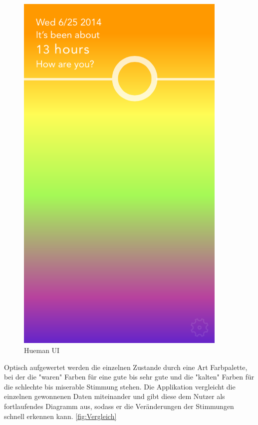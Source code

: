 \begin{figure}
\centering
\includegraphics[width=0.9\textwidth]{images/hueman-app-main-ui.PNG}
\caption{Hueman UI \cite{fig:HUI}}
\label{fig:HUI}
\end{figure}

Optisch aufgewertet werden die einzelnen Zustande durch eine Art Farbpalette, bei der die "waren" Farben für eine gute bis sehr gute und die "kalten" Farben für die schlechte bis miserable Stimmung stehen.
Die Applikation vergleicht die einzelnen gewonnenen Daten miteinander und gibt diese dem Nutzer als fortlaufendes Diagramm aus, sodass er die Veränderungen der Stimmungen schnell erkennen kann.
\ref{fig:Vergleich}


